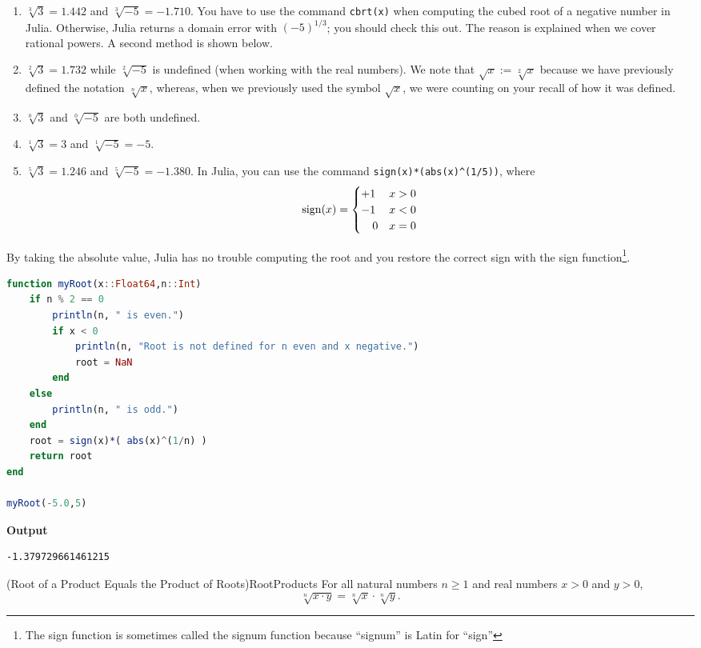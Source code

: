\begin{enumerate}
\renewcommand{\labelenumi}{(\alph{enumi})}
\setlength{\itemsep}{.2cm}
\item $\sqrt[3]{3} = 1.442 $ and $\sqrt[3]{-5} = -1.710$. You have to use the command \texttt{cbrt(x)} when computing the cubed root of a negative number in Julia. Otherwise, Julia returns a domain error with $(-5)^{1/3}$; you should check this out. The reason is explained when we cover rational powers. A second method is shown below.
\item $\sqrt[2]{3} = 1.732$ while $\sqrt[2]{-5}$ is undefined (when working with the real numbers). We note that $\sqrt{x}:=\sqrt[2]{x}$ because we have previously defined the notation $\sqrt[n]{x}$, whereas, when we previously used the symbol $\sqrt{x}$, we were counting on your recall of how it was defined. 
\item $\sqrt[0]{3}$ and $\sqrt[0]{-5}$ are both undefined. 
\item $\sqrt[1]{3} = 3$ and $\sqrt[1]{-5} =-5$.
\item $\sqrt[5]{3} = 1.246$ and $\sqrt[5]{-5} = -1.380$. In Julia, you can use the command \texttt{sign(x)*(abs(x)\textasciicircum(1/5))}, where
$$ {\rm sign}(x) = \begin{cases} +1 & x >0 \\ -1 & x < 0 \\ ~~~0 & x = 0\end{cases}$$
\end{enumerate} 
By taking the absolute value, Julia has no trouble computing the root and you restore the correct sign with the sign function\footnote{The sign function is sometimes called the signum function because ``signum'' is Latin for ``sign''}.
\begin{lstlisting}[language=Julia,style=mystyle]
function myRoot(x::Float64,n::Int)
    if n % 2 == 0
        println(n, " is even.")
        if x < 0        
            println(n, "Root is not defined for n even and x negative.")
            root = NaN
        end
    else
        println(n, " is odd.")        
    end
    root = sign(x)*( abs(x)^(1/n) )
    return root
end

myRoot(-5.0,5)
\end{lstlisting}
\textbf{Output} 
\begin{verbatim}
-1.379729661461215
\end{verbatim}


\Qed

\begin{propColor}{(Root of a Product Equals the Product of Roots)}{RootProducts}
 For all natural numbers $n\ge 1$ and real numbers $x>0$ and $y>0$, 
     \begin{equation}
         \sqrt[n]{x \cdot y} = \sqrt[n]{x} \cdot \sqrt[n]{ y}.
     \end{equation}
\end{propColor}

